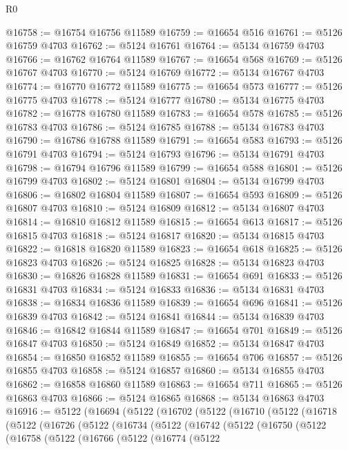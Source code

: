 \begin{lexlean}{R0}
\begin{coremodule}
@16758 := @16754 @16756 @11589
@16759 := @16654 @516
@16761 := @5126 @16759 @4703
@16762 := @5124 @16761
@16764 := @5134 @16759 @4703
@16766 := @16762 @16764 @11589
@16767 := @16654 @568
@16769 := @5126 @16767 @4703
@16770 := @5124 @16769
@16772 := @5134 @16767 @4703
@16774 := @16770 @16772 @11589
@16775 := @16654 @573
@16777 := @5126 @16775 @4703
@16778 := @5124 @16777
@16780 := @5134 @16775 @4703
@16782 := @16778 @16780 @11589
@16783 := @16654 @578
@16785 := @5126 @16783 @4703
@16786 := @5124 @16785
@16788 := @5134 @16783 @4703
@16790 := @16786 @16788 @11589
@16791 := @16654 @583
@16793 := @5126 @16791 @4703
@16794 := @5124 @16793
@16796 := @5134 @16791 @4703
@16798 := @16794 @16796 @11589
@16799 := @16654 @588
@16801 := @5126 @16799 @4703
@16802 := @5124 @16801
@16804 := @5134 @16799 @4703
@16806 := @16802 @16804 @11589
@16807 := @16654 @593
@16809 := @5126 @16807 @4703
@16810 := @5124 @16809
@16812 := @5134 @16807 @4703
@16814 := @16810 @16812 @11589
@16815 := @16654 @613
@16817 := @5126 @16815 @4703
@16818 := @5124 @16817
@16820 := @5134 @16815 @4703
@16822 := @16818 @16820 @11589
@16823 := @16654 @618
@16825 := @5126 @16823 @4703
@16826 := @5124 @16825
@16828 := @5134 @16823 @4703
@16830 := @16826 @16828 @11589
@16831 := @16654 @691
@16833 := @5126 @16831 @4703
@16834 := @5124 @16833
@16836 := @5134 @16831 @4703
@16838 := @16834 @16836 @11589
@16839 := @16654 @696
@16841 := @5126 @16839 @4703
@16842 := @5124 @16841
@16844 := @5134 @16839 @4703
@16846 := @16842 @16844 @11589
@16847 := @16654 @701
@16849 := @5126 @16847 @4703
@16850 := @5124 @16849
@16852 := @5134 @16847 @4703
@16854 := @16850 @16852 @11589
@16855 := @16654 @706
@16857 := @5126 @16855 @4703
@16858 := @5124 @16857
@16860 := @5134 @16855 @4703
@16862 := @16858 @16860 @11589
@16863 := @16654 @711
@16865 := @5126 @16863 @4703
@16866 := @5124 @16865
@16868 := @5134 @16863 @4703
@16916 := @5122
    (@16694
      (@5122
        (@16702
          (@5122
            (@16710
              (@5122
                (@16718
                  (@5122
                    (@16726
                      (@5122
                        (@16734
                          (@5122
                            (@16742
                              (@5122
                                (@16750
                                  (@5122
                                    (@16758
                                      (@5122
                                        (@16766
                                          (@5122
                                            (@16774
                                              (@5122

\end{coremodule}
\end{lexlean}
